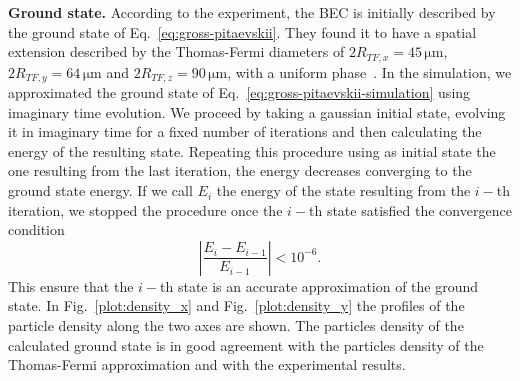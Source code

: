 \noindent \textbf{Ground state.} According to the experiment, the BEC is initially described by the ground state  of Eq.~\eqref{eq:gross-pitaevskii}. They found it to have a spatial extension described by the Thomas-Fermi diameters of $2R_{TF, x} = 45 \, \mathrm{\mu m}$, $2R_{TF, y} = 64 \, \mathrm{\mu m}$ and $2R_{TF, z} = 90 \, \mathrm{\mu m}$, with a uniform phase~\citep{DGPS99}.
In the simulation, we approximated the ground state of Eq.~\eqref{eq:gross-pitaevskii-simulation} using imaginary time evolution. We proceed by taking a gaussian initial state, evolving it in imaginary time for a fixed number of iterations and then calculating the energy of the resulting state. Repeating this procedure using as initial state the one resulting from the last iteration, the energy decreases converging to the ground state energy. If we call $E_i$ the energy of the state resulting from the $i-$th iteration, we stopped the procedure once the $i-$th state satisfied the convergence condition
\begin{equation}
\left| \frac{E_{i} - E_{i-1}}{E_{i-1}} \right| < 10^{-6}.
\end{equation}
This ensure that the $i-$th state is an accurate approximation of the ground state. In Fig.~\ref{plot:density_x} and Fig.~\ref{plot:density_y} the profiles of the particle density along the two axes are shown. The particles density of the calculated ground state is in good agreement with the particles density of the Thomas-Fermi approximation and with the experimental results.
